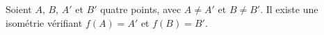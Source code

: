 Soient $A$, $B$, $A'$ et $B'$  quatre points, avec $A\neq A'$ et $B\neq B'$. Il existe une isométrie vérifiant $f(A)=A'$ et $f(B)=B'$.

\begin{reponses}
\end{reponses}

